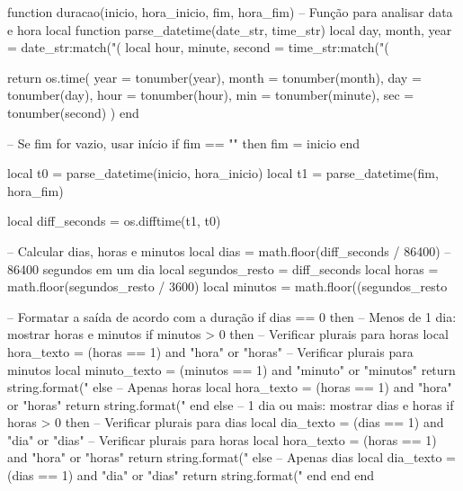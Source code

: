 
\begin{luacode}
function duracao(inicio, hora_inicio, fim, hora_fim)
    -- Função para analisar data e hora
    local function parse_datetime(date_str, time_str)
        local day, month, year = date_str:match("(%
        local hour, minute, second = time_str:match("(%

        return os.time({
            year = tonumber(year),
            month = tonumber(month),
            day = tonumber(day),
            hour = tonumber(hour),
            min = tonumber(minute),
            sec = tonumber(second)
        })
    end

    -- Se fim for vazio, usar início
    if fim == "" then
        fim = inicio
    end

    local t0 = parse_datetime(inicio, hora_inicio)
    local t1 = parse_datetime(fim, hora_fim)

    local diff_seconds = os.difftime(t1, t0)

    -- Calcular dias, horas e minutos
    local dias = math.floor(diff_seconds / 86400)  -- 86400 segundos em um dia
    local segundos_resto = diff_seconds %
    local horas = math.floor(segundos_resto / 3600)
    local minutos = math.floor((segundos_resto %

    -- Formatar a saída de acordo com a duração
    if dias == 0 then
        -- Menos de 1 dia: mostrar horas e minutos
        if minutos > 0 then
            -- Verificar plurais para horas
            local hora_texto = (horas == 1) and "hora" or "horas"
            -- Verificar plurais para minutos
            local minuto_texto = (minutos == 1) and "minuto" or "minutos"
            return string.format("%
        else
            -- Apenas horas
            local hora_texto = (horas == 1) and "hora" or "horas"
            return string.format("%
        end
    else
        -- 1 dia ou mais: mostrar dias e horas
        if horas > 0 then
            -- Verificar plurais para dias
            local dia_texto = (dias == 1) and "dia" or "dias"
            -- Verificar plurais para horas
            local hora_texto = (horas == 1) and "hora" or "horas"
            return string.format("%
        else
            -- Apenas dias
            local dia_texto = (dias == 1) and "dia" or "dias"
            return string.format("%
        end
    end
end
\end{luacode}

